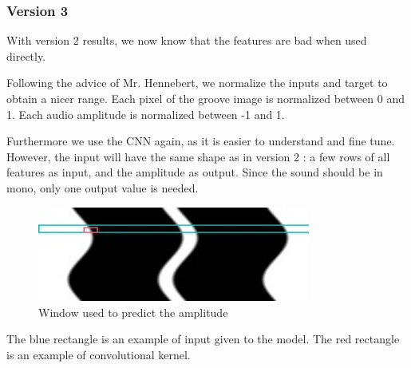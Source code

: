 \documentclass[12pt, twoside]{article}
\begin{document}
\subsubsection{Version 3}
With version 2 results, we now know that the features are bad when used directly.

Following the advice of Mr. Hennebert, we normalize the inputs and target to obtain a nicer range. Each pixel of the groove image is normalized between 0 and 1. Each audio amplitude is normalized between -1 and 1.

Furthermore we use the CNN again, as it is easier to understand and fine tune. However, the input will have the same shape as in version 2 : a few rows of all features as input, and the amplitude as output. Since the sound should be in mono, only one output value is needed.

\begin{figure}[H]
	\centering
	\includegraphics[width=0.8\textwidth]{../images/input.jpg}
	\caption{Window used to predict the amplitude}
	\label{input_v3}
\end{figure}

The blue rectangle is an example of input given to the model. The red rectangle is an example of convolutional kernel.
\end{document}
